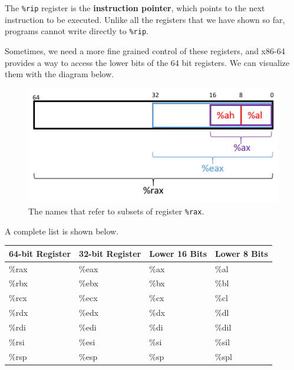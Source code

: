 \documentclass{article}
\begin{document}
      \begin{definition}
        The \texttt{\%rip} register is the \textbf{instruction pointer}, which points to the next instruction to be executed. Unlike all the registers that we have shown so far, programs cannot write directly to \texttt{\%rip}. 
      \end{definition}


      \begin{definition}
        Sometimes, we need a more fine grained control of these registers, and x86-64 provides a way to access the lower bits of the 64 bit registers. We can visualize them with the diagram below. 
        \begin{figure}[H]
          \centering 
          \includegraphics[scale=0.6]{img/register_subsets.png}
          \caption{The names that refer to subsets of register \texttt{\%rax}.} 
          \label{fig:register_subsets}
        \end{figure}
        A complete list is shown below. 
        \begin{table}[H]
          \centering
          \begin{tabular}{|l|l|l|l|}
          \hline
          \textbf{64-bit Register} & \textbf{32-bit Register} & \textbf{Lower 16 Bits} & \textbf{Lower 8 Bits} \\ \hline
          \%rax & \%eax & \%ax & \%al \\ \hline
          \%rbx & \%ebx & \%bx & \%bl \\ \hline
          \%rcx & \%ecx & \%cx & \%cl \\ \hline
          \%rdx & \%edx & \%dx & \%dl \\ \hline
          \%rdi & \%edi & \%di & \%dil \\ \hline
          \%rsi & \%esi & \%si & \%sil \\ \hline
          \%rsp & \%esp & \%sp & \%spl \\ \hline

\end{tabular}
\end{table}
\end{definition}
\end{document}
